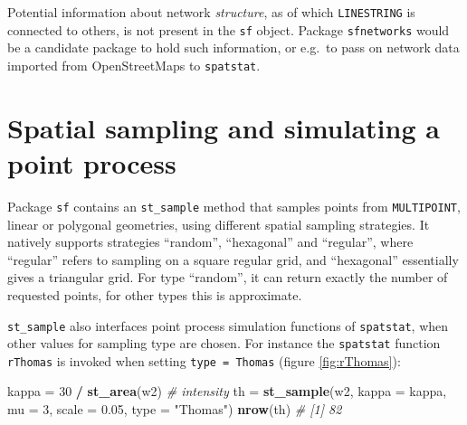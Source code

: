 \documentclass[]{book}
\newenvironment{Shaded}{\begin{snugshade}}{\end{snugshade}}
\newcommand{\CommentTok}[1]{\textcolor[rgb]{0.56,0.35,0.01}{\textit{#1}}}
\newcommand{\DataTypeTok}[1]{\textcolor[rgb]{0.13,0.29,0.53}{#1}}
\newcommand{\DecValTok}[1]{\textcolor[rgb]{0.00,0.00,0.81}{#1}}
\newcommand{\FloatTok}[1]{\textcolor[rgb]{0.00,0.00,0.81}{#1}}
\newcommand{\KeywordTok}[1]{\textcolor[rgb]{0.13,0.29,0.53}{\textbf{#1}}}
\newcommand{\NormalTok}[1]{#1}
\newcommand{\OperatorTok}[1]{\textcolor[rgb]{0.81,0.36,0.00}{\textbf{#1}}}
\newcommand{\StringTok}[1]{\textcolor[rgb]{0.31,0.60,0.02}{#1}}
\begin{document}
\begin{Shaded}
\end{Shaded}

Potential information about network \emph{structure}, as of which
\texttt{LINESTRING} is connected to others, is not present in the \texttt{sf}
object. Package \texttt{sfnetworks} \citep{R-sfnetworks} would be a candidate
package to hold such information, or e.g.~to pass on network data
imported from OpenStreetMaps to \texttt{spatstat}.

\hypertarget{spatial-sampling-and-simulating-a-point-process}{%
\section{Spatial sampling and simulating a point process}\label{spatial-sampling-and-simulating-a-point-process}}

Package \texttt{sf} contains an \texttt{st\_sample} method that samples points
from \texttt{MULTIPOINT}, linear or polygonal geometries, using different
spatial sampling strategies. It natively supports strategies
``random'', ``hexagonal'' and ``regular'', where ``regular'' refers to
sampling on a square regular grid, and ``hexagonal'' essentially
gives a triangular grid. For type ``random'', it can return exactly
the number of requested points, for other types this is approximate.

\texttt{st\_sample} also interfaces point process simulation functions of
\texttt{spatstat}, when other values for sampling type are chosen. For instance
the \texttt{spatstat} function \texttt{rThomas} is invoked when setting \texttt{type\ =\ Thomas}
(figure \ref{fig:rThomas}):

\begin{Shaded}
\begin{Highlighting}[]
\NormalTok{kappa =}\StringTok{ }\DecValTok{30} \OperatorTok{/}\StringTok{ }\KeywordTok{st_area}\NormalTok{(w2) }\CommentTok{# intensity}
\NormalTok{th =}\StringTok{ }\KeywordTok{st_sample}\NormalTok{(w2, }\DataTypeTok{kappa =}\NormalTok{ kappa, }\DataTypeTok{mu =} \DecValTok{3}\NormalTok{, }\DataTypeTok{scale =} \FloatTok{0.05}\NormalTok{, }\DataTypeTok{type =} \StringTok{"Thomas"}\NormalTok{)}
\KeywordTok{nrow}\NormalTok{(th)}
\CommentTok{# [1] 82}
\end{Highlighting}
\end{Shaded}
\end{document}
